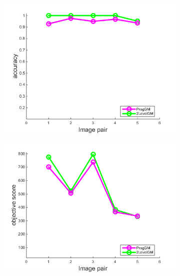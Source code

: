 \begin{figure}[h] \centering
		\begin{subfigure}[b]{0.33\textwidth}
			\centering
			\includegraphics[scale=0.35]{"chapter3/fig/ImageTrafo/anchor_descr/using_cpd_afftrafo/performance/accuracy1"} 
		\end{subfigure} 
		\begin{subfigure}[b]{0.33\textwidth}
			\centering
			\includegraphics[scale=0.35]{"chapter3/fig/ImageTrafo/anchor_descr/using_cpd_afftrafo/performance/score1"} 
		\end{subfigure}
		\begin{subfigure}[b]{0.32\textwidth}
			\centering

\end{subfigure}
\end{figure}
